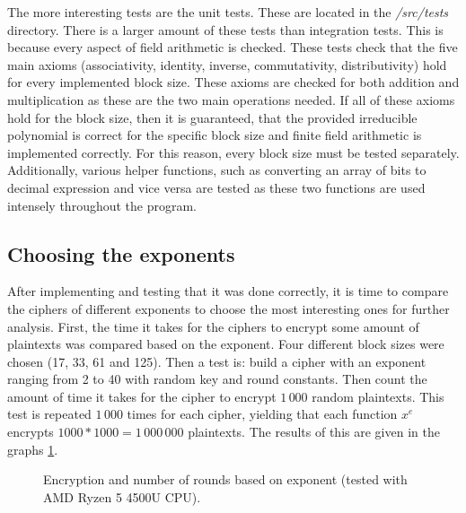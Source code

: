 \documentclass{Resources/UoBLab1}
\theoremstyle{definition}
\begin{document}
The more interesting tests are the unit tests. These are located in the \textit{/src/tests} directory. There is a larger amount of these tests than integration tests. This is because every aspect of field arithmetic is checked. These tests check that the five main axioms (associativity, identity, inverse, commutativity, distributivity) hold for every implemented block size. These axioms are checked for both addition and multiplication as these are the two main operations needed. If all of these axioms hold for the block size, then it is guaranteed, that the provided irreducible polynomial is correct for the specific block size and finite field arithmetic is implemented correctly. For this reason, every block size must be tested separately. Additionally, various helper functions, such as converting an array of bits to decimal expression and vice versa are tested as these two functions are used intensely throughout the program.

\subsection{Choosing the exponents}\label{sub:choosing-exponents}
After implementing and testing that it was done correctly, it is time to compare the ciphers of different exponents to choose the most interesting ones for further analysis. First, the time it takes for the ciphers to encrypt some amount of plaintexts was compared based on the exponent. Four different block sizes were chosen (17, 33, 61 and 125). Then a test is: build a cipher with an exponent ranging from 2 to 40 with random key and round constants. Then count the amount of time it takes for the cipher to encrypt $1\,000$ random plaintexts. This test is repeated $1\,000$ times for each cipher, yielding that each function $x^e$ encrypts $1000*1000=1\,000\,000$ plaintexts. The results of this are given in the graphs \ref{fig:enc-exponent}. 

\begin{figure}
    \caption{Encryption and number of rounds based on exponent (tested with AMD Ryzen 5 4500U CPU).}\label{fig:enc-exponent}
    \hspace{-1cm}
    \centering
    \begin{minipage}{0.5\textwidth}
        \centering
        
    \end{minipage}\hfill
    \begin{minipage}{0.5\textwidth}
        \centering
        
    \end{minipage}

    \hspace{-1cm}
    \begin{minipage}{0.5\textwidth}
        \centering
        
    \end{minipage}\hfill
    \begin{minipage}{0.5\textwidth}
        \centering
        
    \end{minipage}
    \vspace{-1cm}
\end{figure}
\end{document}
